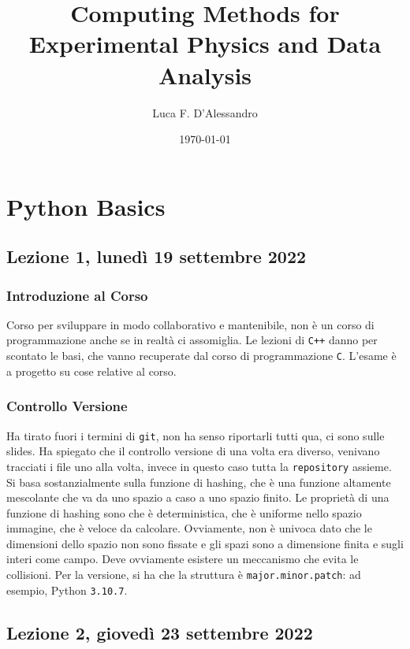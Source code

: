 \documentclass[10pt, a4paper, titlepage]{book}
\title{Computing Methods for Experimental Physics and Data Analysis}
\author{Luca F. D'Alessandro}
\date{\today}
\begin{document}
\maketitle

\tableofcontents


\chapter{Python Basics}

\section{Lezione 1, lunedì 19 settembre 2022}

\subsection{Introduzione al Corso}

Corso per sviluppare in modo collaborativo e mantenibile, non è un corso di programmazione anche se in realtà ci assomiglia.
Le lezioni di \texttt{C++} danno per scontato le basi, che vanno recuperate dal corso di programmazione \texttt{C}.
L'esame è a progetto su cose relative al corso.

\subsection{Controllo Versione}

Ha tirato fuori i termini di \texttt{git}, non ha senso riportarli tutti qua, ci sono sulle slides.
Ha spiegato che il controllo versione di una volta era diverso, venivano tracciati i file uno alla volta, invece in questo caso tutta la \texttt{repository} assieme. Si basa sostanzialmente sulla funzione di hashing, che è una funzione altamente mescolante che va da uno spazio a caso a uno spazio finito.
Le proprietà di una funzione di hashing sono che è deterministica, che è uniforme nello spazio immagine, che è veloce da calcolare.
Ovviamente, non è univoca dato che le dimensioni dello spazio non sono fissate e gli spazi sono a dimensione finita e sugli interi come campo. Deve ovviamente esistere un meccanismo che evita le collisioni.
Per la versione, si ha che la struttura è \texttt{major.minor.patch}: ad esempio, Python \texttt{3.10.7}.

\section{Lezione 2, giovedì 23 settembre 2022}
\end{document}
